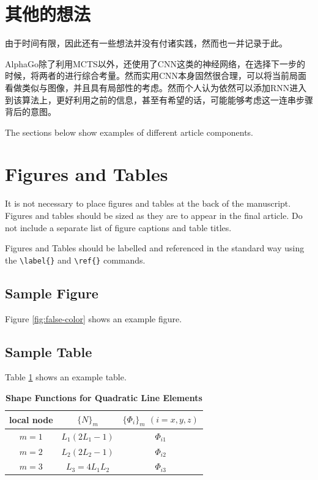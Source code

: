 \documentclass[9pt,twocolumn,twoside]{osajnl}
\begin{document}
\section{其他的想法}
由于时间有限，因此还有一些想法并没有付诸实践，然而也一并记录于此。

AlphaGo除了利用MCTS以外，还使用了CNN这类的神经网络，在选择下一步的时候，将两者的进行综合考量。然而实用CNN本身固然很合理，可以将当前局面看做类似与图像，并且具有局部性的考虑。然而个人认为依然可以添加RNN进入到该算法上，更好利用之前的信息，甚至有希望的话，可能能够考虑这一连串步骤背后的意图。

\label{sec:examples}

The sections below show examples of different article components.

\section{Figures and Tables}

It is not necessary to place figures and tables at the back of the manuscript. Figures and tables should be sized as they are to appear in the final article. Do not include a separate list of figure captions and table titles.

Figures and Tables should be labelled and referenced in the standard way using the \verb|\label{}| and \verb|\ref{}| commands.

\subsection{Sample Figure}

Figure \ref{fig:false-color} shows an example figure.


\subsection{Sample Table}

Table \ref{tab:shape-functions} shows an example table.

\begin{table}[htbp]
\centering
\caption{\bf Shape Functions for Quadratic Line Elements}
\begin{tabular}{ccc}
\hline
local node & $\{N\}_m$ & $\{\Phi_i\}_m$ $(i=x,y,z)$ \\
\hline
$m = 1$ & $L_1(2L_1-1)$ & $\Phi_{i1}$ \\
$m = 2$ & $L_2(2L_2-1)$ & $\Phi_{i2}$ \\
$m = 3$ & $L_3=4L_1L_2$ & $\Phi_{i3}$ \\
\hline
\end{tabular}
  \label{tab:shape-functions}
\end{table}
\end{document}
